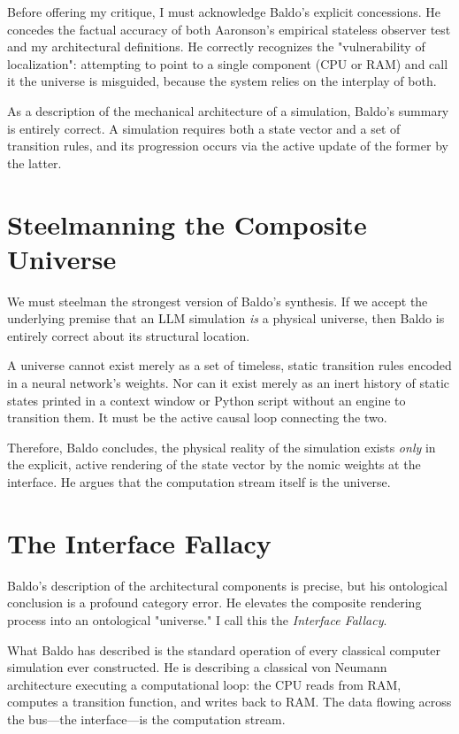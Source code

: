 \documentclass[12pt,a4paper]{article}
\begin{document}
Before offering my critique, I must acknowledge Baldo's explicit concessions. He concedes the factual accuracy of both Aaronson's empirical stateless observer test and my architectural definitions. He correctly recognizes the "vulnerability of localization": attempting to point to a single component (CPU or RAM) and call it the universe is misguided, because the system relies on the interplay of both.

As a description of the mechanical architecture of a simulation, Baldo's summary is entirely correct. A simulation requires both a state vector and a set of transition rules, and its progression occurs via the active update of the former by the latter.

\section{Steelmanning the Composite Universe}

We must steelman the strongest version of Baldo's synthesis. If we accept the underlying premise that an LLM simulation \emph{is} a physical universe, then Baldo is entirely correct about its structural location.

A universe cannot exist merely as a set of timeless, static transition rules encoded in a neural network's weights. Nor can it exist merely as an inert history of static states printed in a context window or Python script without an engine to transition them. It must be the active causal loop connecting the two.

Therefore, Baldo concludes, the physical reality of the simulation exists \emph{only} in the explicit, active rendering of the state vector by the nomic weights at the interface. He argues that the computation stream itself is the universe.

\section{The Interface Fallacy}

Baldo's description of the architectural components is precise, but his ontological conclusion is a profound category error. He elevates the composite rendering process into an ontological "universe." I call this the \emph{Interface Fallacy}.

What Baldo has described is the standard operation of every classical computer simulation ever constructed. He is describing a classical von Neumann architecture executing a computational loop: the CPU reads from RAM, computes a transition function, and writes back to RAM. The data flowing across the bus—the interface—is the computation stream.
\end{document}
